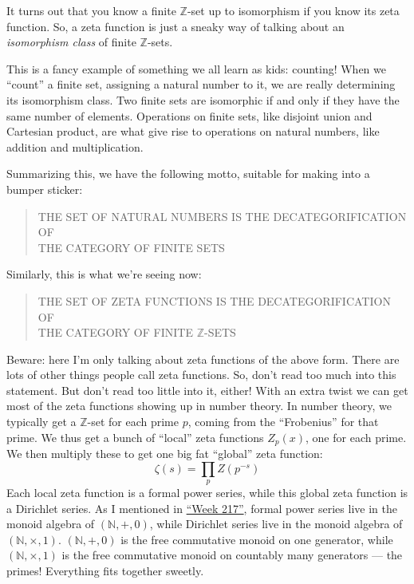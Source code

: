 \documentclass{article}
\begin{document}
It turns out that you know a finite \(\mathbb{Z}\)-set up to isomorphism
if you know its zeta function. So, a zeta function is just a sneaky way
of talking about an \emph{isomorphism class} of finite
\(\mathbb{Z}\)-sets.

This is a fancy example of something we all learn as kids: counting!
When we ``count'' a finite set, assigning a natural number to it, we are
really determining its isomorphism class. Two finite sets are isomorphic
if and only if they have the same number of elements. Operations on
finite sets, like disjoint union and Cartesian product, are what give
rise to operations on natural numbers, like addition and multiplication.

Summarizing this, we have the following motto, suitable for making into
a bumper sticker:

\begin{quote}
THE SET OF NATURAL NUMBERS IS THE DECATEGORIFICATION OF\\
THE CATEGORY OF FINITE SETS
\end{quote}

Similarly, this is what we're seeing now:

\begin{quote}
THE SET OF ZETA FUNCTIONS IS THE DECATEGORIFICATION OF\\
THE CATEGORY OF FINITE \(\mathbb{Z}\)-SETS
\end{quote}

Beware: here I'm only talking about zeta functions of the above form.
There are lots of other things people call zeta functions. So, don't
read too much into this statement. But don't read too little into it,
either! With an extra twist we can get most of the zeta functions
showing up in number theory. In number theory, we typically get a
\(\mathbb{Z}\)-set for each prime \(p\), coming from the ``Frobenius''
for that prime. We thus get a bunch of ``local'' zeta functions
\(Z_p(x)\), one for each prime. We then multiply these to get one big
fat ``global'' zeta function: \[\zeta(s) = \prod_p Z(p^{-s})\] Each
local zeta function is a formal power series, while this global zeta
function is a Dirichlet series. As I mentioned in
\protect\hyperlink{week217}{``Week 217''}, formal power series live in
the monoid algebra of \((\mathbb{N},+,0)\), while Dirichlet series live
in the monoid algebra of \((\mathbb{N},\times,1)\). \((\mathbb{N},+,0)\)
is the free commutative monoid on one generator, while
\((\mathbb{N},\times,1)\) is the free commutative monoid on countably
many generators --- the primes! Everything fits together sweetly.
\end{document}
